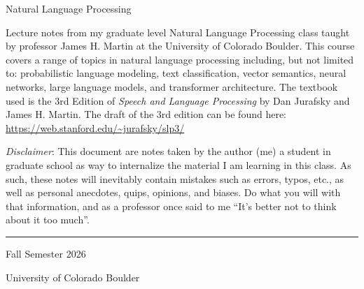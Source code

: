 \documentclass[11pt]{article}
\begin{document}

\begin{titlepage}
	\centering \vspace*{\fill}

	{\huge Natural Language Processing \par}

	\vspace{20pt}


	\begin{center}
		\begin{minipage}{0.85\textwidth}
			Lecture notes from my graduate level Natural Language Processing class
			taught by professor James H. Martin at the University of Colorado Boulder.
			This course covers a range of topics in natural language processing
			including, but not limited to: probabilistic language modeling, text
			classification, vector semantics, neural networks, large language models,
			and transformer architecture. The textbook used is the 3rd Edition of
			\textit{Speech and Language Processing} by Dan Jurafsky and James H.
			Martin. The draft of the 3rd edition can be found here:
			\url{https://web.stanford.edu/~jurafsky/slp3/}

			\vspace{20pt}

			\textit{Disclaimer}: This document are notes taken by the author (me) a
			student in graduate school as way to internalize the material I am
			learning in this class. As such, these notes will inevitably contain
			mistakes such as errors, typos, etc., as well as personal anecdotes,
			quips, opinions, and biases. Do what you will with that information, and
			as a professor once said to me ``It's better not to think about it too
			much''.
		\end{minipage}
	\end{center}

	\vspace*{\fill}

	\noindent\rule{10cm}{0.4pt}

	Fall Semester 2026

	University of Colorado Boulder
\end{titlepage}


\newpage
{}
\tableofcontents
\newpage

\end{document}
